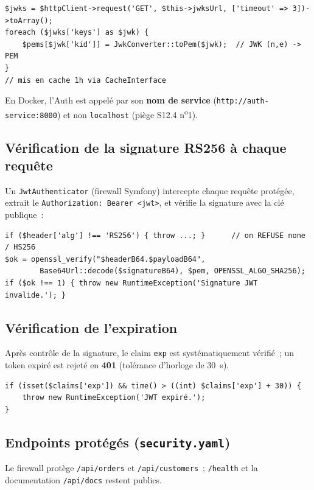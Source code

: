 \documentclass[11pt,a4paper]{article}
\begin{document}
\begin{lstlisting}
$jwks = $httpClient->request('GET', $this->jwksUrl, ['timeout' => 3])->toArray();
foreach ($jwks['keys'] as $jwk) {
    $pems[$jwk['kid']] = JwkConverter::toPem($jwk);  // JWK (n,e) -> PEM
}
// mis en cache 1h via CacheInterface
\end{lstlisting}

En Docker, l'Auth est appelé par son \textbf{nom de service} (\texttt{http://auth-service:8000})
et non \texttt{localhost} (piège S12.4 n\textsuperscript{o}1).

\subsection{Vérification de la signature RS256 à chaque requête}

Un \texttt{JwtAuthenticator} (firewall Symfony) intercepte chaque requête protégée, extrait le
\texttt{Authorization: Bearer <jwt>}, et vérifie la signature avec la clé publique~:

\begin{lstlisting}
if ($header['alg'] !== 'RS256') { throw ...; }      // on REFUSE none / HS256
$ok = openssl_verify("$headerB64.$payloadB64",
        Base64Url::decode($signatureB64), $pem, OPENSSL_ALGO_SHA256);
if ($ok !== 1) { throw new RuntimeException('Signature JWT invalide.'); }
\end{lstlisting}

\subsection{Vérification de l'expiration}

Après contrôle de la signature, le claim \texttt{exp} est systématiquement vérifié~; un token
expiré est rejeté en \textbf{401} (tolérance d'horloge de 30~s).

\begin{lstlisting}
if (isset($claims['exp']) && time() > ((int) $claims['exp'] + 30)) {
    throw new RuntimeException('JWT expiré.');
}
\end{lstlisting}

\subsection{Endpoints protégés (\texttt{security.yaml})}

Le firewall protège \texttt{/api/orders} et \texttt{/api/customers}~; \texttt{/health} et la
documentation \texttt{/api/docs} restent publics.
\end{document}
